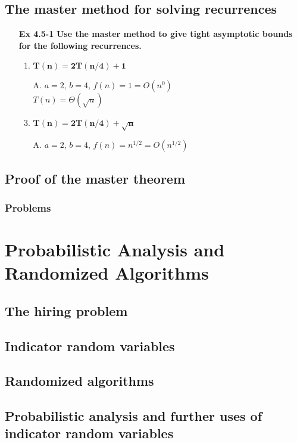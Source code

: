 \documentclass[fontsize=12pt,paper=a4,open=any]{book}
\begin{document}
\section{The master method for solving recurrences}
\begin{enumerate}
	\item[\textbf{Ex 4.5-1}]
		\textbf{Use the master method to give tight asymptotic bounds for the following recurrences.}
		\begin{enumerate}
			\item $\mathbf{T(n) = 2T(n/4) + 1}$
			\item[A.]
			$a=2$, $b=4$, $f(n)=1=O(n^0)$ \\
			$T(n) = \Theta(\sqrt{n})$			
			\item $\mathbf{T(n) = 2T(n/4) + \sqrt{n}}$
			\item[A.]
			$a=2$, $b=4$, $f(n)=n^{1/2} = O(n^{1/2})$\\			
			
		\end{enumerate}
\end{enumerate}

\section{Proof of the master theorem}

\subsection*{Problems}


\chapter{Probabilistic Analysis and Randomized Algorithms}

\section{The hiring problem}

\section{Indicator random variables}

\section{Randomized algorithms}

\section{Probabilistic analysis and further uses of indicator random variables}
\end{document}
